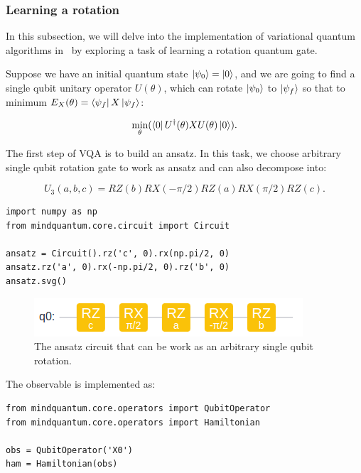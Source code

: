 \subsubsection{Learning a rotation}

In this subsection, we will delve into the implementation of variational quantum algorithms in \MindQuantum\ by exploring a task of learning a rotation quantum gate.

Suppose we have an initial quantum state $\ket{\psi_0}=\ket{0}$, and we are going to find a single qubit unitary operator $U(\theta)$, which can rotate $\ket{\psi_0}$ to $\ket{\psi_f}$ so that to minimum $E_X(\theta) = \bra{\psi_f}X\ket{\psi_f}$:

\begin{equation}
  \min_\theta(\bra{0}U^\dagger(\theta)XU(\theta)\ket{0}).
\end{equation}

The first step of VQA is to build an ansatz. In this task, we choose arbitrary single qubit rotation gate \Uthree to work as ansatz and \Uthree can also decompose into:

\begin{equation}
  U_3(a, b, c) = RZ(b)RX(-\pi/2)RZ(a)RX(\pi/2)RZ(c).
\end{equation}

\begin{lstlisting}
import numpy as np
from mindquantum.core.circuit import Circuit

ansatz = Circuit().rz('c', 0).rx(np.pi/2, 0)
ansatz.rz('a', 0).rx(-np.pi/2, 0).rz('b', 0)
ansatz.svg()
\end{lstlisting}

\begin{figure}[h]
  \begin{center}
    \includegraphics[width=0.9\linewidth]{images/4_1_ansatz.png}
  \end{center}
  \caption{The ansatz circuit that can be work as an arbitrary single qubit rotation.}
  \label{fig:u3_ansatz}
\end{figure}

The observable is implemented as:

\begin{lstlisting}
from mindquantum.core.operators import QubitOperator
from mindquantum.core.operators import Hamiltonian

obs = QubitOperator('X0')
ham = Hamiltonian(obs)
\end{lstlisting}

